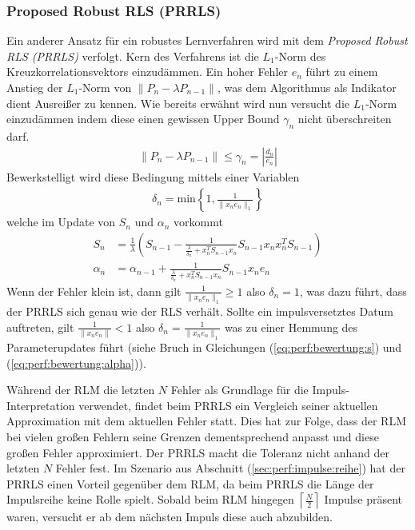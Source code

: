 \documentclass[a4paper, 12pt]{article}
\begin{document}
{\subsubsection{Proposed Robust RLS (PRRLS)}
\label{sec:perf:bewertung:prrls}
Ein anderer Ansatz für ein robustes Lernverfahren wird mit dem \emph{Proposed Robust RLS (PRRLS)} \cite{bhotto2011robust} verfolgt. Kern des Verfahrens ist die $L_1$-Norm des Kreuzkorrelationsvektors einzudämmen. Ein hoher Fehler $e_n$ führt zu einem Anstieg der $L_1$-Norm von $\|P_n - \lambda P_{n-1}\|$, was dem Algorithmus als Indikator dient Ausreißer zu kennen. Wie bereits erwähnt wird nun versucht die $L_1$-Norm einzudämmen indem diese einen gewissen Upper Bound $\gamma_n$ nicht überschreiten darf.
\begin{align}
  \|P_n - \lambda P_{n-1}\| \leq \gamma_n = \left|\frac{d_n}{e_n}\right| \nonumber
\end{align}
Bewerkstelligt wird diese Bedingung mittels einer Variablen
\begin{align}
  \delta_n = \text{min}\left\{1,\frac{1}{\|x_n e_n\|_1}\right\} \nonumber
\end{align}
welche im Update von $S_n$ und $\alpha_n$ vorkommt
\begin{align}
  \label{eq:perf:bewertung:s}
  S_n &= \frac{1}{\lambda}\left( S_{n-1} - \frac{1}{\frac{\lambda}{\delta_n} + x_n^TS_{n-1}x_n} S_{n-1}x_n x_n^TS_{n-1} \right)\\
  \label{eq:perf:bewertung:alpha}
  \alpha_n &= \alpha_{n-1} + \frac{1}{\frac{\lambda}{\delta_n} + x_n^TS_{n-1}x_n} S_{n-1}x_n e_n
\end{align}
Wenn der Fehler klein ist, dann gilt $\frac{1}{\|x_n e_n\|_1} \geq 1$ also $\delta_n=1$, was dazu führt, dass der PRRLS sich genau wie der RLS verhält.
Sollte ein impulsversetztes Datum auftreten, gilt $\frac{1}{\|x_n e_n\|} < 1$ also $\delta_n=\frac{1}{\|x_n e_n\|_1}$ was zu einer Hemmung des Parameterupdates führt (siehe Bruch in Gleichungen (\ref{eq:perf:bewertung:s}) und (\ref{eq:perf:bewertung:alpha})).

Während der RLM die letzten $N$ Fehler als Grundlage für die Impuls-Interpretation verwendet, findet beim PRRLS ein Vergleich seiner aktuellen Approximation mit dem aktuellen Fehler statt. 
Dies hat zur Folge, dass der RLM bei vielen großen Fehlern seine Grenzen dementsprechend anpasst und diese großen Fehler approximiert. Der PRRLS macht die Toleranz nicht anhand der letzten $N$ Fehler fest.
Im Szenario aus Abschnitt (\ref{sec:perf:impulse:reihe}) hat der PRRLS einen Vorteil gegenüber dem RLM, da beim PRRLS die Länge der Impulsreihe keine Rolle spielt. Sobald beim RLM hingegen $\left\lceil \frac{N}{2} \right\rceil$ Impulse präsent waren, versucht er ab dem nächsten Impuls diese auch abzubilden.

}
\end{document}
